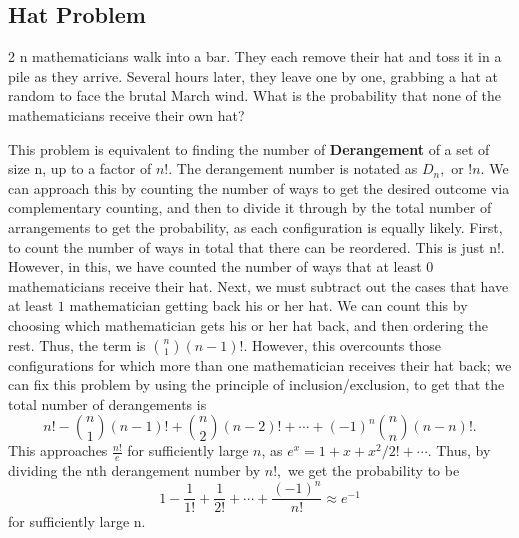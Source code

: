\subsection{Hat Problem}
\begin{problem}
	2 n mathematicians walk into a bar. They each remove their hat and toss it in a pile as they arrive. Several hours later, they leave one by one, grabbing a hat at random to face the brutal March wind. What is the probability that none of the mathematicians receive their own hat?
\end{problem}
\begin{solution}
	This problem is equivalent to finding the number of \textbf{Derangement} of a set of size n, up to a factor of $n!$. The derangement number is notated as $D_n,$ or $!n.$
	\newline
	We can approach this by counting the number of ways to get the desired outcome via complementary counting, and then to divide it through by the total number of arrangements to get the probability, as each configuration is equally likely. First, to count the number of ways in total that there can be reordered. This is just n!. However, in this, we have counted the number of ways that at least $0$ mathematicians receive their hat. Next, we must subtract out the cases that have at least $1$ mathematician getting back his or her hat. We can count this by choosing which mathematician gets his or her hat back, and then ordering the rest. Thus, the term is ${n\choose1}\left(n-1\right)!.$ However, this overcounts those configurations for which more than one mathematician receives their hat back; we can fix this problem by using the principle of inclusion/exclusion, to get that the total number of derangements is \[n!-{n\choose1}\left(n-1\right)!+{n\choose2}\left(n-2\right)!+\cdots+(-1)^n{n\choose n}\left(n-n\right)!.\]
	This approaches $\frac{n!}{e}$ for sufficiently large $n$, as $e^x=1+x+x^2/2!+\cdots.$ Thus, by dividing the nth derangement number by $n!,$ we get the probability to be \[1-\frac{1}{1!}+\frac{1}{2!}+\cdots+\frac{(-1)^n}{n!}\approx e^{-1}\] for sufficiently large n.
\end{solution}

